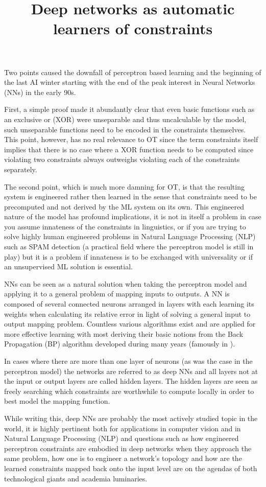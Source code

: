 \documentclass[a4paper,12pt]{article}
\begin{document}
Two points caused the downfall of perceptron based learning and the beginning of the last AI winter
starting with the end of the peak interest in Neural Networks (NNs) in the early 90s.

First, a simple proof made it abundantly clear that even basic functions such as an exclusive or
(XOR) were unseparable and thus uncalculable by the model, such unseparable functions need to be
encoded in the constraints themselves. This point, however, has no real relevance to OT since the
term constraints itself implies that there is no case where a XOR function needs to be computed
since violating two constraints always outweighs violating each of the constraints separately.

The second point, which is much more damning for OT, is that the resulting system is engineered
rather then learned in the sense that constraints need to be precomputed and not derived by the ML
system on its own. This engineered nature of the model has profound implications, it is not in
itself a problem in case you assume innateness of the constraints in linguistics, or if you are
trying to solve highly human engineered problems in Natural Language Processing (NLP) such as SPAM
detection (a practical field where the perceptron model is still in play) but it is a problem if
innateness is to be exchanged with universality or if an unsupervised ML solution is essential.

\title{Deep networks as automatic learners of constraints}

NNs can be seen as a natural solution when taking the perceptron model and applying it to a general
problem of mapping inputs to outputs. A NN is composed of several connected neurons arranged in
layers with each learning its weights when calculating its relative error in light of solving a
general input to output mapping problem. Countless various algorithms exist and are applied for
more effective learning with most deriving their basic notions from the Back Propagation (BP)
algorithm developed during many years (famously in \cite{rumelhart_learning_1988}).

In cases where there are more than one layer of neurons (as was the case in the perceptron model)
the networks are referred to as deep NNs and all layers not at the input or output layers are called
hidden layers. The hidden layers are seen as freely searching which constraints are worthwhile to
compute locally in order to best model the mapping function.

While writing this, deep NNs are probably the most actively studied topic in the world, it is highly
pertinent both for applications in computer vision and in Natural Language Processing (NLP) and
questions such as how engineered perceptron constraints are embodied in deep networks when they
approach the same problem, how one is to engineer a network's topology and how are the learned
constraints mapped back onto the input level are on the agendas of both technological giants and
academia luminaries.
\end{document}
